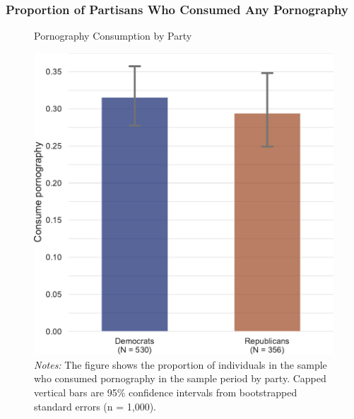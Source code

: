 \documentclass[12pt, letterpaper]{article}
\begin{document}
\subsubsection{Proportion of Partisans Who Consumed Any Pornography}
\begin{figure}
	\centering
	\caption{Pornography Consumption by Party}
	\includegraphics[width=.5\textwidth]{figs/consume_porn_yes_no.pdf}
	\caption*{\footnotesize \emph{Notes:} 
		The figure shows the proportion of individuals in the sample who consumed pornography in the sample period by party.
		Capped vertical bars are 95\% confidence intervals from bootstrapped standard errors (n = 1,000).
	}
	\label{fig:consume_porn_yes_no}
\end{figure}
\clearpage

\FloatBarrier
\end{document}
